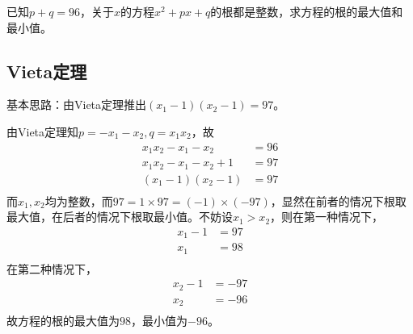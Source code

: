 

已知$p + q = 96$，关于$x$的方程$x^2 + px + q$的根都是整数，求方程的根的最大值和最小值。


\subsection{Vieta定理}

基本思路：由Vieta定理推出$(x_1 - 1)(x_2 - 1) = 97$。

由Vieta定理知$p = -x_1 - x_2, q = x_1x_2$，故
\begin{align*}
  x_1x_2 - x_1 - x_2 &= 96 \\
  x_1x_2 - x_1 - x_2 + 1 &= 97 \\
  (x_1 - 1)(x_2 - 1) &= 97 \\
\end{align*}
而$x_1, x_2$均为整数，而$97 = 1\times97 = (-1)\times(-97)$，显然在前者的情况下根取最大值，在后者的情况下根取最小值。不妨设$x_1 > x_2$，则在第一种情况下，
\begin{align*}
  x_1 - 1 &= 97 \\
  x_1 &= 98 \\
\end{align*}
在第二种情况下，
\begin{align*}
  x_2 - 1 &= -97 \\
  x_2 &= -96 \\
\end{align*}
故方程的根的最大值为$98$，最小值为$-96$。
